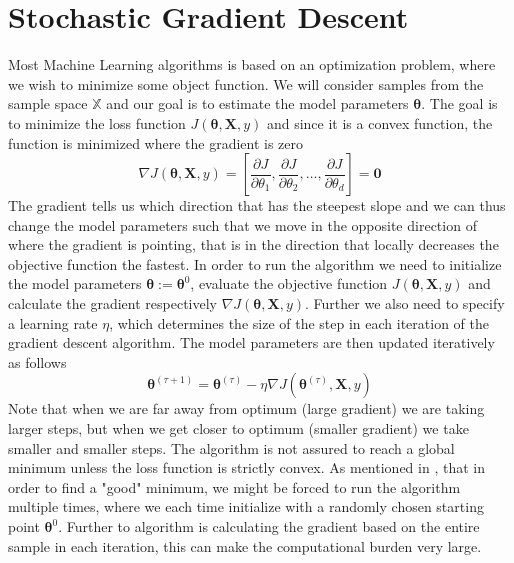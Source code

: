 \section{Stochastic Gradient Descent} \label{sec:sgd}
Most Machine Learning algorithms is based on an optimization problem, where we wish to minimize some object function. We will consider samples from the sample space $\mathbb{X}$ and our goal is to estimate the model parameters $\boldsymbol{\theta}$. The goal is to minimize the loss function  $J(\boldsymbol{\theta},\boldsymbol{X},y)$ and since it is a convex function, the function is minimized where the gradient is zero
\begin{equation*}
    \nabla J(\boldsymbol{\theta},\boldsymbol{X},y)=\left[\frac{\partial J}{\partial\theta_1},\frac{\partial J}{\partial\theta_2},\ldots,\frac{\partial J}{\partial\theta_d}\right]=\boldsymbol{0}
\end{equation*}
The gradient tells us which direction that has the steepest slope and we can thus change the model parameters such that we move in the opposite direction of where the gradient is pointing, that is in the direction that locally decreases the objective function the fastest. In order to run the algorithm we need to initialize the model parameters $\boldsymbol{\theta}:=\boldsymbol{\theta}^0$, evaluate the objective function $J(\boldsymbol{\theta},\boldsymbol{X},y)$ and calculate the gradient respectively $\nabla J(\boldsymbol{\theta},\boldsymbol{X},y)$. Further we also need to specify a learning rate $\eta$, which determines the size of the step in each iteration of the gradient descent algorithm. The model parameters are then updated iteratively as follows
\begin{equation*}
    \boldsymbol{\theta}^{(\tau+1)}=\boldsymbol{\theta}^{(\tau)}-\eta \nabla J(\boldsymbol{\theta}^{(\tau)},\boldsymbol{X},y)
\end{equation*}
Note that when we are far away from optimum (large gradient) we are taking larger steps, but when we get closer to optimum (smaller gradient) we take smaller and smaller steps. The algorithm is not assured to reach a global minimum unless the loss function is strictly convex. As mentioned in \cite{bishop2007}, that in order to find a "good" minimum, we might be forced to run the algorithm multiple times, where we each time initialize with a randomly chosen starting point $\boldsymbol{\theta}^0$. Further to algorithm is calculating the gradient based on the entire sample in each iteration, this can make the computational burden very large. \\
